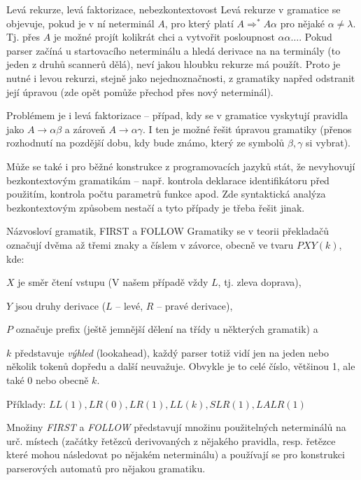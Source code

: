 \begin{obecne}{Levá rekurze, levá faktorizace, nebezkontextovost}
Levá rekurze v gramatice se objevuje, pokud je v ní neterminál $A$, pro který platí $A\Rightarrow^{*} A\alpha$ pro nějaké $\alpha\neq\lambda$. Tj. přes $A$ je možné projít kolikrát chci a vytvořit posloupnost $\alpha\alpha\dots$. Pokud parser začíná u startovacího neterminálu a hledá derivace na na terminály  (to jeden z druhů scannerů dělá), neví jakou hloubku rekurze má použít. Proto je nutné i levou rekurzi, stejně jako nejednoznačnosti, z gramatiky napřed odstranit její úpravou (zde opět pomůže přechod přes nový neterminál).

Problémem je i levá faktorizace -- případ, kdy se v gramatice vyskytují pravidla jako $A\to \alpha\beta$ a zároveň $A\to \alpha\gamma$. I ten je možné řešit úpravou gramatiky (přenos rozhodnutí na pozdější dobu, kdy bude známo, který ze symbolů $\beta,\gamma$ si vybrat).

Může se také i pro běžné konstrukce z programovacích jazyků stát, že nevyhovují bezkontextovým gramatikám -- např. kontrola deklarace identifikátoru před použitím, kontrola počtu parametrů funkce apod. Zde syntaktická analýza bezkontextovým způsobem nestačí a tyto případy je třeba řešit jinak.
\end{obecne}

\begin{definiceN}{Názvosloví gramatik, FIRST a FOLLOW}
Gramatiky se v teorii překladačů označují dvěma až třemi znaky a číslem v závorce, obecně ve tvaru $PXY(k)$, kde:
\begin{pitemize}
    \item $X$ je směr čtení vstupu (V našem případě vždy $L$, tj. zleva doprava),
    \item $Y$ jsou druhy derivace ($L$ – levé, $R$ – pravé derivace),
    \item $P$ označuje prefix (ještě jemnější dělení na třídy u některých gramatik) a
    \item $k$ představuje \emph{výhled} (lookahead), každý parser totiž vidí jen na jeden nebo několik tokenů dopředu a další neuvažuje. Obvykle je to celé číslo, většinou 1, ale také 0 nebo obecně $k$.
\end{pitemize}
Příklady: $LL(1), LR(0), LR(1), LL(k), SLR(1), LALR(1)$

Množiny \emph{FIRST} a \emph{FOLLOW} představují množinu použitelných neterminálů na urč. místech (začátky řetězců derivovaných z nějakého pravidla, resp. řetězce které mohou následovat po nějakém neterminálu) a používají se pro konstrukci parserových automatů pro nějakou gramatiku.
\end{definiceN}

